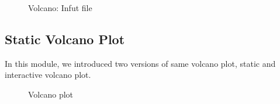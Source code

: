 \documentclass[
  a4paper,
  DIV=11,
  numbers=noendperiod,
  oneside,
  open=any]{scrreport}
\begin{document}
\begin{figure}[H]


\caption{\label{fig-vol1}Volcano: Infut file}

\end{figure}%

\subsection{Static Volcano Plot}\label{static-volcano-plot}

In this module, we introduced two versions of same volcano plot, static
and interactive volcano plot.

\begin{figure}[H]


\caption{\label{fig-volstat}Volcano plot}

\end{figure}%
\end{document}
